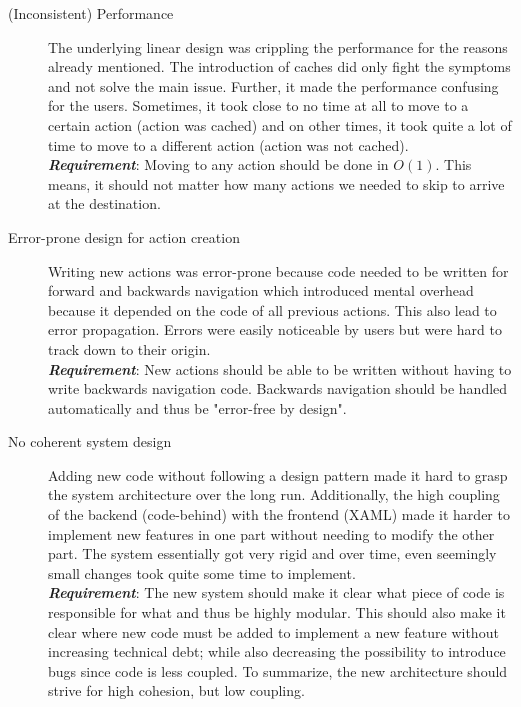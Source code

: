 \begin{description}
\item [(Inconsistent) Performance] The underlying linear design was crippling the performance for the reasons already mentioned. The introduction of caches did only fight the symptoms and not solve the main issue. Further, it made the performance confusing for the users. Sometimes, it took close to no time at all to move to a certain action (action was cached) and on other times, it took quite a lot of time to move to a different action (action was not cached). \\
\textit{\textbf{Requirement}}: Moving to any action should be done in $O(1)$. This means, it should not matter how many actions we needed to skip to arrive at the destination.
\item [Error-prone design for action creation] Writing new actions was error-prone because code needed to be written for forward and backwards navigation which introduced mental overhead because it depended on the code of all previous actions. This also lead to error propagation. Errors were easily noticeable by users but were hard to track down to their origin.\\
\textit{\textbf{Requirement}}: New actions should be able to be written without having to write backwards navigation code. Backwards navigation should be handled automatically and thus be "error-free by design".
\item [No coherent system design] Adding new code without following a design pattern made it hard to grasp the system architecture over the long run. Additionally, the high coupling of the backend (code-behind) with the frontend (XAML) made it harder to implement new features in one part without needing to modify the other part. The system essentially got very rigid and over time, even seemingly small changes took quite some time to implement.\\
\textit{\textbf{Requirement}}: The new system should make it clear what piece of code is responsible for what and thus be highly modular. This should also make it clear where new code must be added to implement a new feature without increasing technical debt; while also decreasing the possibility to introduce bugs since code is less coupled. To summarize, the new architecture should strive for high cohesion, but low coupling.
\end{description}

